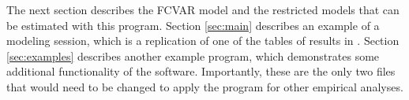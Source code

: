 \documentclass[article]{jss}
\begin{document}




The next section describes the FCVAR model and the restricted models that can be estimated with this program. Section \ref{sec:main} describes an example of a modeling session, which is a replication of one of the tables of results in \cite{JNP2014}. Section \ref{sec:examples} describes another example program, which demonstrates some additional functionality of the software. Importantly, these are the only two files that would need to be changed to apply the program for other empirical analyses. 


\end{document}
